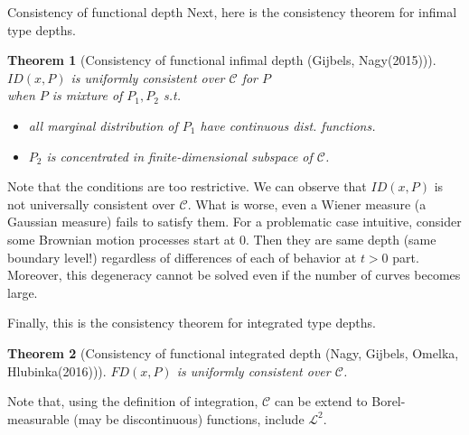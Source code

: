 \documentclass[aspectratio=169,ignorenonframetext,9pt]{beamer}
\theoremstyle{plain}
\newtheorem{thm}{Theorem}[section]
\theoremstyle{definition}
\begin{document}
\begin{frame}{Consistency of functional depth}
Next, here is the consistency theorem for infimal type depths.
\begin{thm}[Consistency of functional infimal depth (Gijbels, Nagy(2015))]
    $ID(x,P)$ is uniformly consistent over $\mathcal{C}$ for $P$ \\ 
    when $P$ is mixture of $P_1,P_2$ s.t.
    \begin{itemize}
        \item all marginal distribution of $P_1$ have continuous dist. functions.
        \item $P_2$ is concentrated in finite-dimensional subspace of $\mathcal{C}$.
    \end{itemize}
\end{thm}
Note that the conditions are too restrictive. We can observe that $ID(x,P)$ is not universally consistent over $\mathcal{C}$.
What is worse, even a Wiener measure (a Gaussian measure) fails to satisfy them.
For a problematic case intuitive, consider some Brownian motion processes start at 0. Then they are
same depth (same boundary level!) regardless of differences of each of behavior at $t>0$ part.
Moreover, this degeneracy cannot be solved even if the number of curves becomes large.

Finally, this is the consistency theorem for integrated type depths.
\begin{thm}[Consistency of functional integrated depth (Nagy, Gijbels, Omelka, Hlubinka(2016))]
        $FD(x,P)$ is uniformly consistent over $\mathcal{C}$.
\end{thm}
Note that, using the definition of integration, $\mathcal{C}$ can be extend to
Borel-measurable (may be discontinuous) functions, include $\mathcal{L}^2$.
\end{frame}
\end{document}

